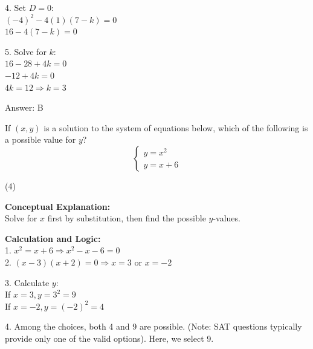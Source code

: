 \documentclass[11pt,paper=a4,answers]{exam}
\begin{document}
\begin{questions}
\begin{solution}
4. Set $D = 0$: \\
   $(-4)^2 - 4(1)(7 - k) = 0$ \\
   $16 - 4(7 - k) = 0$

\vspace{10pt}

5. Solve for $k$: \\
   $16 - 28 + 4k = 0$ \\
   $-12 + 4k = 0$ \\
   $4k = 12 \Rightarrow k = 3$

\vspace{25pt}

Answer: \colorbox{yellow!100}{B}
\end{solution}

\vspace{40pt}

\question
If $(x, y)$ is a solution to the system of equations below, which of the following is a possible value for $y$?
\[ \begin{cases} y = x^2 \\ y = x + 6 \end{cases} \]
\begin{tasks}(4)
\end{tasks}

\begin{solution}
\textbf{Conceptual Explanation:} \\
Solve for $x$ first by substitution, then find the possible $y$-values.

\vspace{20pt}

\textbf{Calculation and Logic:} \\
1. $x^2 = x + 6 \Rightarrow x^2 - x - 6 = 0$ \\
2. $(x - 3)(x + 2) = 0 \Rightarrow x = 3$ or $x = -2$

\vspace{10pt}

3. Calculate $y$: \\
   If $x = 3, y = 3^2 = 9$ \\
   If $x = -2, y = (-2)^2 = 4$

\vspace{10pt}

4. Among the choices, both 4 and 9 are possible. (Note: SAT questions typically provide only one of the valid options). Here, we select 9.


\end{solution}
\end{questions}
\end{document}
